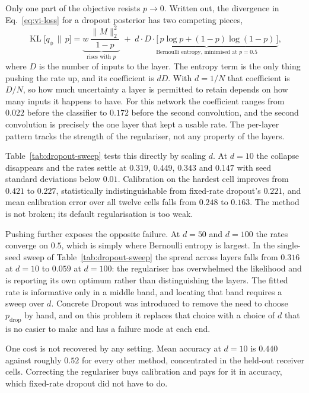 \documentclass{article}
\begin{document}
Only one part of the objective resists $p \to 0$. Written out, the divergence in
Eq.~\eqref{eq:vi-loss} for a dropout posterior has two competing pieces,
\begin{equation}
\operatorname{KL}\big[q_\phi \,\|\, p\big]
= \underbrace{w\,\frac{\lVert M \rVert_2^2}{1-p}}_{\text{rises with } p}
\; + \;
\underbrace{d \cdot D \cdot \big[\, p\log p + (1-p)\log(1-p) \,\big]}_{\text{Bernoulli entropy, minimised at } p = 0.5},
\label{eq:concrete-kl}
\end{equation}
where $D$ is the number of inputs to the layer. The entropy term is the only
thing pushing the rate up, and its coefficient is $dD$. With $d = 1/N$ that
coefficient is $D/N$, so how much uncertainty a layer is permitted to retain
depends on how many inputs it happens to have. For this network the coefficient
ranges from $0.022$ before the classifier to $0.172$ before the second
convolution, and the second convolution is precisely the one layer that kept a
usable rate. The per-layer pattern tracks the strength of the regulariser, not
any property of the layers.

Table~\ref{tab:dropout-sweep} tests this directly by scaling $d$. At $d = 10$
the collapse disappears and the rates settle at $0.319$, $0.449$, $0.343$ and
$0.147$ with seed standard deviations below $0.01$. Calibration on the hardest
cell improves from $0.421$ to $0.227$, statistically indistinguishable from
fixed-rate dropout's $0.221$, and mean calibration error over all twelve cells
falls from $0.248$ to $0.163$. The method is not broken; its default
regularisation is too weak.

Pushing further exposes the opposite failure. At $d = 50$ and $d = 100$ the
rates converge on $0.5$, which is simply where Bernoulli entropy is largest. In
the single-seed sweep of Table~\ref{tab:dropout-sweep} the spread across layers
falls from $0.316$ at $d=10$ to $0.059$ at $d=100$: the regulariser has
overwhelmed the likelihood and is reporting its own optimum rather than
distinguishing the layers. The fitted rate is
informative only in a middle band, and locating that band requires a sweep over
$d$. Concrete Dropout was introduced to remove the need to choose
$p_{\text{drop}}$ by hand, and on this problem it replaces that choice with a
choice of $d$ that is no easier to make and has a failure mode at each end.

One cost is not recovered by any setting. Mean accuracy at $d = 10$ is $0.440$
against roughly $0.52$ for every other method, concentrated in the held-out
receiver cells. Correcting the regulariser buys calibration and pays for it in
accuracy, which fixed-rate dropout did not have to do.
\end{document}
